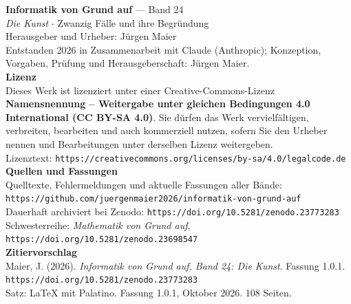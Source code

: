 \clearpage
\thispagestyle{empty}
\vspace*{\fill}
\begin{flushleft}
{\small\color{grau}
\textbf{\color{tief}Informatik von Grund auf} --- Band 24\\[2pt]
\textit{Die Kunst} $\cdot$ Zwanzig Fälle und ihre Begründung\\[14pt]

Herausgeber und Urheber: Jürgen Maier\\[2pt]
Entstanden 2026 in Zusammenarbeit mit Claude (Anthropic); Konzeption, Vorgaben, Prüfung und Herausgeberschaft: Jürgen Maier.\\[14pt]

\textbf{Lizenz}\\[2pt]
Dieses Werk ist lizenziert unter einer Creative-Commons-Lizenz \textbf{Namensnennung -- Weitergabe unter gleichen Bedingungen 4.0 International (CC BY-SA 4.0)}. Sie dürfen das Werk vervielfältigen, verbreiten, bearbeiten und auch kommerziell nutzen, sofern Sie den Urheber nennen und Bearbeitungen unter derselben Lizenz weitergeben.\\[2pt]
Lizenztext: \texttt{https://creativecommons.org/licenses/by-sa/4.0/legalcode.de}\\[14pt]

\textbf{Quellen und Fassungen}\\[2pt]
Quelltexte, Fehlermeldungen und aktuelle Fassungen aller Bände:\\
\texttt{https://github.com/juergenmaier2026/informatik-von-grund-auf}\\[2pt]
Dauerhaft archiviert bei Zenodo: \texttt{https://doi.org/10.5281/zenodo.23773283}\\[2pt]
Schwesterreihe: \textit{Mathematik von Grund auf}, \texttt{https://doi.org/10.5281/zenodo.23698547}\\[14pt]

\textbf{Zitiervorschlag}\\[2pt]
Maier, J. (2026). \textit{Informatik von Grund auf, Band 24: Die Kunst}. Fassung 1.0.1. \texttt{https://doi.org/10.5281/zenodo.23773283}\\[14pt]

Satz: \LaTeX{} mit Palatino. Fassung 1.0.1, Oktober 2026. 108 Seiten.
}
\end{flushleft}
\vspace*{1.5cm}
\clearpage
